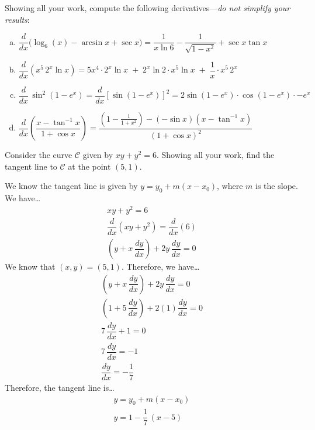 \documentclass[12pt,letterpaper]{exam}
\begin{document}
\begin{questions}
Showing all your work, compute the following derivatives---\textit{do not simplify your results}:
	\begin{enumerate}[(a)]
	\item $\dfrac{d}{dx} \big( \log_6(x) - \arcsin x + \sec x \big)= \dfrac{1}{x \ln 6} - \dfrac{1}{\sqrt{1 - x^2}} + \sec x \tan x$ \vfill
	
	\item $\dfrac{d}{dx} \left(x^5 \, 2^x \ln x \right)= 5x^4 \cdot 2^x \ln x \;+\; 2^x \ln 2 \cdot x^5 \ln x \;+\; \dfrac{1}{x} \cdot x^5 \,2^x$ \vfill
	
	\item $\dfrac{d}{dx}\, \sin^2(1 - e^x)= \dfrac{d}{dx} \left[ \sin(1 - e^x) \right]^2= 2 \sin(1 - e^x) \cdot \cos(1 - e^x) \cdot -e^x$ \vfill
	\item $\dfrac{d}{dx} \left( \dfrac{x - \tan^{-1} x}{1 + \cos x} \right)= \dfrac{\left(1 - \frac{1}{1 + x^2} \right) - (-\sin x) (x - \tan^{-1} x)}{(1 + \cos x)^2}$ \vfill
	\end{enumerate}



\newpage
{} \par\vspace{0.3cm}

Consider the curve $\mathcal{C}$ given by $xy + y^2= 6$. Showing all your work, find the tangent line to $\mathcal{C}$ at the point $(5, 1)$. \pspace

\tsol We know the tangent line is given by $y= y_0 + m(x - x_0)$, where $m$ is the slope. We have\dots
	\[
	\begin{gathered}
	xy + y^2= 6 \\[0.3cm]
	\dfrac{d}{dx} \left( xy + y^2 \right)= \dfrac{d}{dx} (6) \\[0.3cm]
	\left(y + x \,\dfrac{dy}{dx} \right) + 2y \, \dfrac{dy}{dx}= 0
	\end{gathered}
	\] \pspace
We know that $(x, y)= (5, 1)$. Therefore, we have\dots
	\[
	\begin{gathered}
	\left(y + x \,\dfrac{dy}{dx} \right) + 2y \, \dfrac{dy}{dx}= 0 \\[0.3cm]
	\left( 1 + 5 \, \dfrac{dy}{dx} \right) + 2(1) \dfrac{dy}{dx}= 0 \\[0.3cm]
	7 \, \dfrac{dy}{dx} + 1= 0 \\[0.3cm]
	7 \, \dfrac{dy}{dx}= -1 \\[0.3cm]
	\dfrac{dy}{dx}= -\dfrac{1}{7}
	\end{gathered}
	\]
Therefore, the tangent line is\dots
	\[
	\begin{gathered}
	y= y_0 + m(x - x_0) \\[0.3cm]
	y= 1 - \dfrac{1}{7}\, (x - 5)
	\end{gathered}
	\]




\end{questions}
\end{document}

